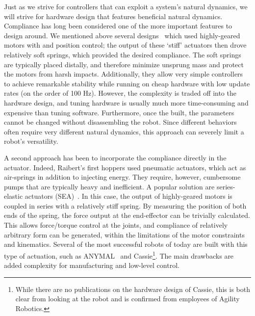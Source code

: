 Just as we strive for controllers that can exploit a system's natural dynamics, we will strive for hardware design that features beneficial natural dynamics.
Compliance has long been considered one of the more important features to design around.
We mentioned above several designs~\cite{sprowitz2013towards,buchli2006resonance,altendorfer2001rhex,owaki2013simple} which used highly-geared motors with and position control; the output of these `stiff' actuators then drove relatively soft springs, which provided the desired compliance. The soft springs are typically placed distally, and therefore minimize unsprung mass and protect the motors from harsh impacts. Additionally, they allow very simple controllers to achieve remarkable stability while running on cheap hardware with low update rates (on the order of 100 Hz). However, the complexity is traded off into the hardware design, and tuning hardware is usually much more time-consuming and expensive than tuning software. Furthermore, once the built, the parameters cannot be changed without disassembling the robot. Since different behaviors often require very different natural dynamics, this approach can severely limit a robot's versatility. \par
A second approach has been to incorporate the compliance directly in the actuator. Indeed, Raibert's first hoppers used pneumatic actuators, which act as air-springs in addition to injecting energy. They require, however, cumbersome pumps that are typically heavy and inefficient.
A popular solution are series-elastic actuators (SEA)~\cite{pratt1995series}. In this case, the output of highly-geared motors is coupled in series with a relatively stiff spring. By measuring the position of both ends of the spring, the force output at the end-effector can be trivially calculated. This allows force/torque control at the joints, and compliance of relatively arbitrary form can be generated, within the limitations of the motor constraints and kinematics. Several of the most successful robots of today are built with this type of actuation, such as ANYMAL~\cite{hutter2016anymal} and Cassie\footnote{While there are no publications on the hardware design of Cassie, this is both clear from looking at the robot and is confirmed from employees of Agility Robotics.}. The main drawbacks are added complexity for manufacturing and low-level control.
\par
